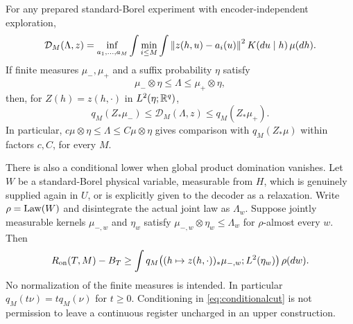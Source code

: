 \begin{theorem}\label{thm:cutduality}
For any prepared standard-Borel experiment with encoder-independent exploration,
\begin{equation}\label{eq:exactfunctional}
 \mathcal D_M(\Lambda,z)=\inf_{a_1,\ldots,a_M}
 \int\min_{i\le M}\int\left\lVert z(h,u)-a_i(u)\right\rVert^2K(du\mid h)\,\mu(dh).
\end{equation}
If finite measures $\mu_-,\mu_+$ and a suffix probability $\eta$ satisfy
\[
 \mu_-\otimes\eta\le\Lambda\le\mu_+\otimes\eta,
\]
then, for $Z(h)=z(h,\cdot)$ in $L^2(\eta;\mathbb R^q)$,
\begin{equation}\label{eq:cutsandwich}
 q_M(Z_*\mu_-)\le\mathcal D_M(\Lambda,z)
 \le q_M(Z_*\mu_+).
\end{equation}
In particular, $c\mu\otimes\eta\le\Lambda\le C\mu\otimes\eta$ gives comparison with $q_M(Z_*\mu)$ within factors $c,C$, for every $M$.

There is also a conditional lower when global product domination vanishes. Let $W$ be a standard-Borel physical variable, measurable from $H$, which is genuinely supplied again in $U$, or is explicitly given to the decoder as a relaxation. Write $\rho=\operatorname{Law}(W)$ and disintegrate the actual joint law as $\Lambda_w$. Suppose jointly measurable kernels $\mu_{-,w}$ and $\eta_w$ satisfy $\mu_{-,w}\otimes\eta_w\le\Lambda_w$ for $\rho$-almost every $w$. Then
\begin{equation}\label{eq:conditionalcut}
 R_{\mathrm{on}}(T,M)-B_T\ge
 \int q_M\bigl((h\mapsto z(h,\cdot))_*\mu_{-,w};L^2(\eta_w)\bigr)\,\rho(dw).
\end{equation}
No normalization of the finite measures is intended. In particular $q_M(t\nu)=tq_M(\nu)$ for $t\ge0$. Conditioning in \eqref{eq:conditionalcut} is not permission to leave a continuous register uncharged in an upper construction.
\end{theorem}
